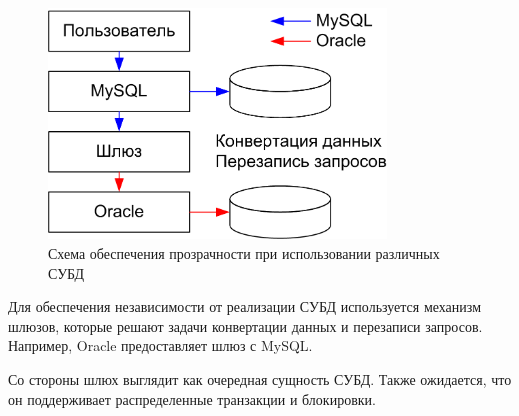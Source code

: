 \begin{figure}[h]
	\centering
	\includegraphics[width=0.8\textwidth]{../assets/kgeorgiy/distributed/Distributed_Gateway.png}
	\caption{Схема обеспечения прозрачности при использовании различных СУБД}
	\label{env-independence}
\end{figure}

Для обеспечения независимости от реализации СУБД используется механизм шлюзов, которые решают
задачи конвертации данных и перезаписи запросов. Например, Oracle предоставляет шлюз с MySQL.

Со стороны шлюх выглядит как очередная сущность СУБД. Также ожидается, что он поддерживает
распределенные транзакции и блокировки.
